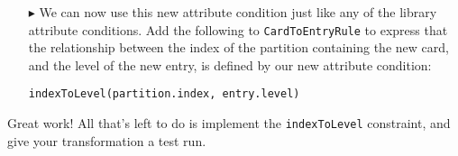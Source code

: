 \begin{enumerate}
\item[$\blacktriangleright$] We can now use this new attribute condition just like any of the library attribute conditions.
Add the following to \texttt{CardToEntryRule} to express that the relationship between the index of the partition containing the new card, and the level of the new entry, is defined by our new attribute condition:

\verb|indexToLevel(partition.index, entry.level)|
\end{enumerate}

Great work! All that's left to do is implement the \texttt{indexToLevel} constraint, and give your transformation a test run.


